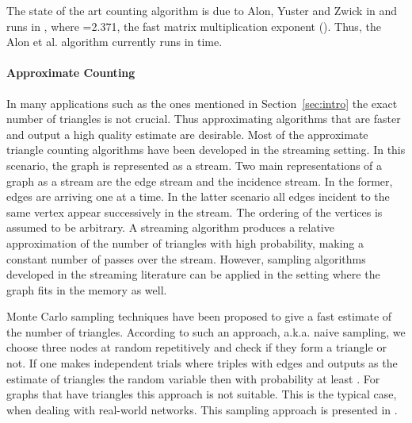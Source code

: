\documentclass{llncs}
\begin{document}
The state of the art counting algorithm is due to Alon, Yuster and Zwick in \cite{alon:alon} and runs in ,
where =2.371, the fast matrix multiplication
exponent (\cite{CopperWino:CopperWino}). Thus, the Alon et al. algorithm currently runs in  time. 

\paragraph{Approximate Counting} 
In many applications such as the ones mentioned in Section~\ref{sec:intro} the exact number of triangles is not crucial.
Thus approximating algorithms that are faster and output a high quality estimate are desirable. 
Most of the approximate triangle counting algorithms have been developed in the 
streaming setting. In this scenario, the graph is represented as a stream. 
Two main representations of a graph as a stream are the edge stream and the incidence stream. In the former, edges are arriving
one at a time. In the latter scenario
all edges incident to the same vertex appear successively in the stream. The ordering of the vertices 
is assumed to be arbitrary. A streaming algorithm produces a relative  approximation 
of the number of triangles with high probability, making a constant number of passes over the stream. 
However, sampling algorithms developed in the streaming literature can be applied in the setting where the graph fits in the memory as well. 

Monte Carlo sampling techniques have been proposed to give a fast estimate of the number of triangles.
According to such an approach, a.k.a. naive sampling, we choose three nodes at random repetitively and check if they form a triangle or not. 
If one makes 
independent trials where triples with  edges  and outputs as the estimate of triangles the random variable 
then   with probability at least .
For graphs that have  triangles this approach is not suitable. This is the typical case, when dealing with real-world networks. 
This sampling approach is presented in \cite{shank:wanger1}. 
\end{document}
